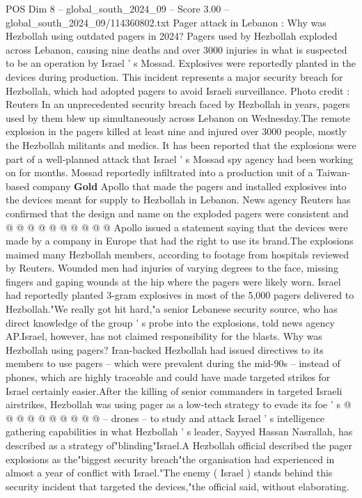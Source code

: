 \begin{textsample}{POS Dim 8 – global\_south\_2024\_09 – Score 3.00 – global\_south\_2024\_09/114360802.txt}  \label{ex:f8_pos_286}
Pager attack in Lebanon : Why was Hezbollah using outdated pagers in 2024?
Pagers used by Hezbollah exploded across Lebanon, causing nine deaths and over 3000 injuries in what is suspected to be an operation by Israel ' s Mossad.
Explosives were reportedly planted in the devices during production.
This incident represents a major security breach for Hezbollah, which had adopted pagers to avoid Israeli surveillance.
Photo credit : Reuters In an unprecedented security breach faced by Hezbollah in years, pagers used by them blew up simultaneously across Lebanon on Wednesday.The remote explosion in the pagers killed at least nine and injured over 3000 people, mostly the Hezbollah militants and medics.
It has been reported that the explosions were part of a well-planned attack that Israel ' s Mossad spy agency had been working on for months.
Mossad reportedly infiltrated into a production unit of a Taiwan-based company \textbf{Gold} Apollo that made the pagers and installed explosives into the devices meant for supply to Hezbollah in Lebanon.
News agency Reuters has confirmed that the design and name on the exploded pagers were consistent and @ @ @ @ @ @ @ @ @ @ Apollo issued a statement saying that the devices were made by a company in Europe that had the right to use its brand.The explosions maimed many Hezbollah members, according to footage from hospitals reviewed by Reuters.
Wounded men had injuries of varying degrees to the face, missing fingers and gaping wounds at the hip where the pagers were likely worn.
Israel had reportedly planted 3-gram explosives in most of the 5,000 pagers delivered to Hezbollah."We really got hit hard,"a senior Lebanese security source, who has direct knowledge of the group ' s probe into the explosions, told news agency AP.Israel, however, has not claimed responsibility for the blasts.
Why was Hezbollah using pagers?
Iran-backed Hezbollah had issued directives to its members to use pagers -- which were prevalent during the mid-90s -- instead of phones, which are highly traceable and could have made targeted strikes for Israel certainly easier.After the killing of senior commanders in targeted Israeli airstrikes, Hezbollah was using pager as a low-tech strategy to evade its foe ' s @ @ @ @ @ @ @ @ @ @ -- drones -- to study and attack Israel ' s intelligence gathering capabilities in what Hezbollah ' s leader, Sayyed Hassan Nasrallah, has described as a strategy of"blinding"Israel.A Hezbollah official described the pager explosions as the"biggest security breach"the organisation had experienced in almost a year of conflict with Israel."The enemy ( Israel ) stands behind this security incident that targeted the devices,"the official said, without elaborating.

\end{textsample}
